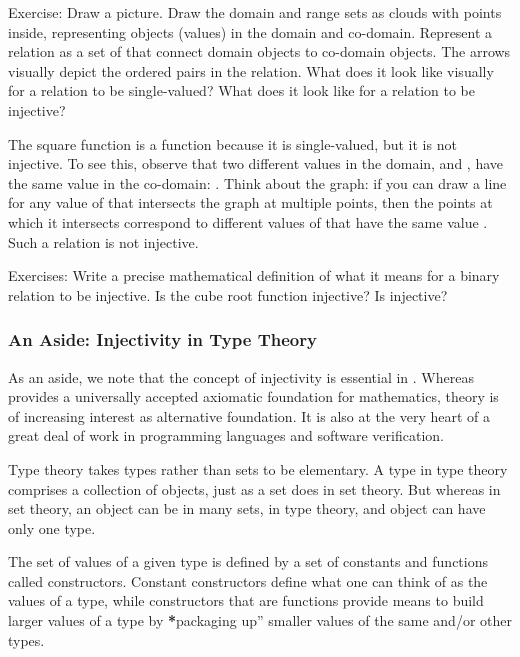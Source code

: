 \documentclass[letterpaper,10pt,english]{sphinxmanual}
\begin{document}
Exercise: Draw a picture. Draw the domain and range sets as clouds
with points inside, representing objects (values) in the domain and
co-domain. Represent a relation as a set of  that connect
domain objects to co-domain objects. The arrows visually depict the
ordered pairs in the relation. What does it look like visually for a
relation to be single-valued? What does it look like for a relation to
be injective?

The square function is a function because it is single-valued, but it
is not injective. To see this, observe that two different values in
the domain,  and , have the same value in the co-domain: .
Think about the graph: if you can draw a  line for any
value of  that intersects the graph at multiple points, then the
points at which it intersects correspond to different values of 
that have the same value . Such a relation is not
injective.

Exercises: Write a precise mathematical definition of what it means
for a binary relation to be injective.  Is the cube root function
injective? Is  injective?


\subsubsection{An Aside: Injectivity in Type Theory}
\label{\detokenize{08-relations:an-aside-injectivity-in-type-theory}}
As an aside, we note that the concept of injectivity is essential in
.  Whereas  provides a universally accepted
axiomatic foundation for mathematics,  theory is of increasing
interest as alternative foundation. It is also at the very heart of a
great deal of work in programming languages and software verification.

Type theory takes types rather than sets to be elementary. A type in
type theory comprises a collection of objects, just as a set does in
set theory. But whereas in set theory, an object can be in many sets,
in type theory, and object can have only one type.

The set of values of a given type is defined by a set of constants and
functions called constructors. Constant constructors define what one
can think of as the  values of a type, while constructors
that are functions provide means to build larger values of a type by
{\color{red}\bfseries{}*}packaging up” smaller values of the same and/or other types.
\end{document}
